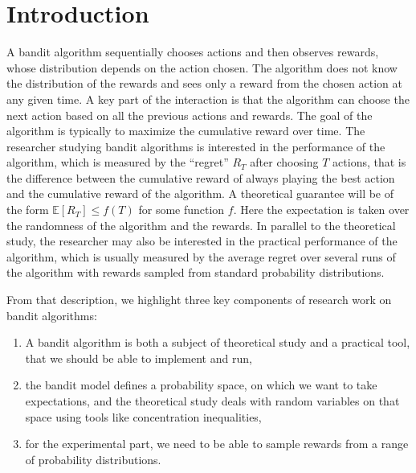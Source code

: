 \chapter{Introduction}

A bandit algorithm sequentially chooses actions and then observes rewards, whose distribution depends on the action chosen.
The algorithm does not know the distribution of the rewards and sees only a reward from the chosen action at any given time.
A key part of the interaction is that the algorithm can choose the next action based on all the previous actions and rewards.
The goal of the algorithm is typically to maximize the cumulative reward over time.
The researcher studying bandit algorithms is interested in the performance of the algorithm, which is measured by the ``regret'' $R_T$ after choosing $T$ actions, that is the difference between the cumulative reward of always playing the best action and the cumulative reward of the algorithm.
A theoretical guarantee will be of the form $\mathbb{E}[R_T] \le f(T)$ for some function $f$.
Here the expectation is taken over the randomness of the algorithm and the rewards.
In parallel to the theoretical study, the researcher may also be interested in the practical performance of the algorithm, which is usually measured by the average regret over several runs of the algorithm with rewards sampled from standard probability distributions.

From that description, we highlight three key components of research work on bandit algorithms:
\begin{enumerate}
  \item A bandit algorithm is both a subject of theoretical study and a practical tool, that we should be able to implement and run,
  \item the bandit model defines a probability space, on which we want to take expectations, and the theoretical study deals with random variables on that space using tools like concentration inequalities,
  \item for the experimental part, we need to be able to sample rewards from a range of probability distributions.
\end{enumerate}
